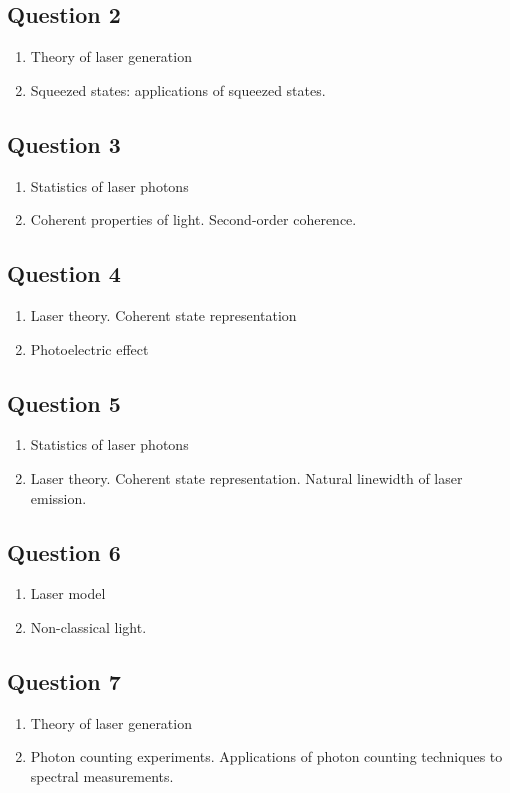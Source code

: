 \documentclass[12pt,a4paper]{article}
\begin{document}
\subsection*{Question 2} 
\begin{enumerate}
\item Theory of laser generation
\item Squeezed states: applications of squeezed states. 
\end{enumerate}

\subsection*{Question 3} 
\begin{enumerate}
\item Statistics of laser photons
\item Coherent properties of light.
 Second-order coherence.
\end{enumerate}

\subsection*{Question 4} 
\begin{enumerate}
\item Laser theory. Coherent state representation
\item Photoelectric effect
\end{enumerate}

\subsection*{Question 5} 
\begin{enumerate}
\item Statistics of laser photons
\item Laser theory. Coherent state representation. Natural
  linewidth of laser emission.
\end{enumerate}

\subsection*{Question 6} 
\begin{enumerate}
\item Laser model
\item Non-classical light.
\end{enumerate}

\subsection*{Question 7} 
\begin{enumerate}
\item Theory of laser generation
\item Photon counting experiments. Applications of photon counting techniques to spectral measurements.
\end{enumerate}
\end{document}
